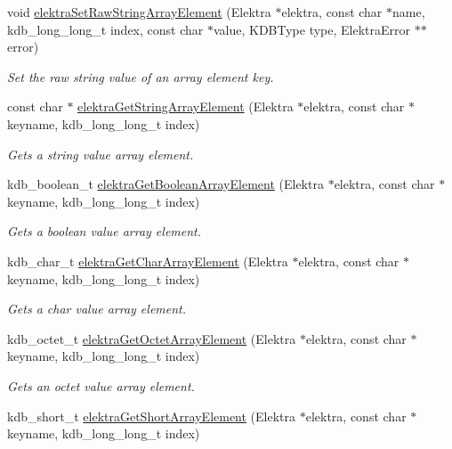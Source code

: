 \begin{DoxyCompactItemize}
void \hyperlink{group__highlevel_ga965e0b2ce7d5e8938965259c3f584600}{elektra\+Set\+Raw\+String\+Array\+Element} (Elektra $\ast$elektra, const char $\ast$name, kdb\+\_\+long\+\_\+long\+\_\+t index, const char $\ast$value, K\+D\+B\+Type type, Elektra\+Error $\ast$$\ast$error)
\begin{DoxyCompactList}\small\item\em Set the raw string value of an array element key. \end{DoxyCompactList}\item 
const char $\ast$ \hyperlink{group__highlevel_gaf445216facccfc7ad6740b594e7a8f6e}{elektra\+Get\+String\+Array\+Element} (Elektra $\ast$elektra, const char $\ast$keyname, kdb\+\_\+long\+\_\+long\+\_\+t index)
\begin{DoxyCompactList}\small\item\em Gets a string value array element. \end{DoxyCompactList}\item 
kdb\+\_\+boolean\+\_\+t \hyperlink{group__highlevel_ga3b9f1f569c63be91d4211bafd0aae249}{elektra\+Get\+Boolean\+Array\+Element} (Elektra $\ast$elektra, const char $\ast$keyname, kdb\+\_\+long\+\_\+long\+\_\+t index)
\begin{DoxyCompactList}\small\item\em Gets a boolean value array element. \end{DoxyCompactList}\item 
kdb\+\_\+char\+\_\+t \hyperlink{group__highlevel_gacb11d0dbaaa6acbd6c16004a97ccd721}{elektra\+Get\+Char\+Array\+Element} (Elektra $\ast$elektra, const char $\ast$keyname, kdb\+\_\+long\+\_\+long\+\_\+t index)
\begin{DoxyCompactList}\small\item\em Gets a char value array element. \end{DoxyCompactList}\item 
kdb\+\_\+octet\+\_\+t \hyperlink{group__highlevel_ga2c67031aef8c34c639ec56b87006386d}{elektra\+Get\+Octet\+Array\+Element} (Elektra $\ast$elektra, const char $\ast$keyname, kdb\+\_\+long\+\_\+long\+\_\+t index)
\begin{DoxyCompactList}\small\item\em Gets an octet value array element. \end{DoxyCompactList}\item 
kdb\+\_\+short\+\_\+t \hyperlink{group__highlevel_ga5f078052ece43a36fe247515ada74a7d}{elektra\+Get\+Short\+Array\+Element} (Elektra $\ast$elektra, const char $\ast$keyname, kdb\+\_\+long\+\_\+long\+\_\+t index)
$$
\end{DoxyCompactItemize}
